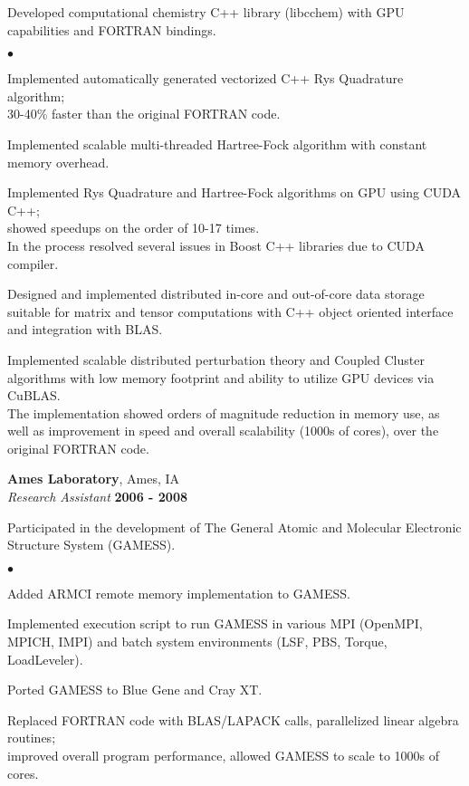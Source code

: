 \documentclass[overlap,line]{cv}
\newenvironment{list2}{
  \begin{list}{$\bullet$}{%
      \setlength{\itemsep}{0in}
      \setlength{\parsep}{0in} \setlength{\parskip}{0in}
      \setlength{\topsep}{0in} \setlength{\partopsep}{0in} 
      \setlength{\leftmargin}{0.2in}}}{\end{list}}
\begin{document}
\begin{resume}
Developed computational chemistry C++ library (libcchem) with GPU capabilities
and FORTRAN bindings.
\vspace{.05in}
\begin{list2}
\item Implemented automatically generated vectorized C++ Rys Quadrature algorithm; \\
  30-40\% faster than the original FORTRAN code.
\item Implemented scalable multi-threaded Hartree-Fock algorithm with constant memory overhead.
\item Implemented Rys Quadrature and Hartree-Fock algorithms on GPU using CUDA C++; \\
  showed speedups on the order of 10-17 times.\\
  In the process resolved several issues in Boost C++ libraries due to CUDA compiler.
\item Designed and implemented distributed in-core and out-of-core
  data storage suitable for matrix and tensor computations with C++
  object oriented interface and integration with BLAS.
\item Implemented scalable distributed perturbation theory and Coupled Cluster
  algorithms with low memory footprint and ability to utilize GPU devices via CuBLAS. \\
  The implementation showed orders of magnitude reduction in memory use, as
  well as improvement in speed and overall scalability (1000s of cores),
  over the original FORTRAN code.
\end{list2}


{\bf Ames Laboratory}, Ames, IA \\
{\it Research Assistant} \hfill {\bf 2006 - 2008}

Participated in the development of The General Atomic and Molecular Electronic Structure System
(GAMESS).
\vspace{.05in}
\begin{list2}
\item Added ARMCI remote memory implementation to GAMESS.
\item Implemented execution script to run GAMESS in various MPI (OpenMPI, MPICH, IMPI)
  and batch system environments (LSF, PBS, Torque, LoadLeveler).
\item Ported GAMESS to Blue Gene and Cray XT.
\item Replaced FORTRAN code with BLAS/LAPACK calls, parallelized linear algebra routines; \\
  improved overall program performance, allowed GAMESS to scale to 1000s of cores.
\end{list2}


\end{resume}
\end{document}
